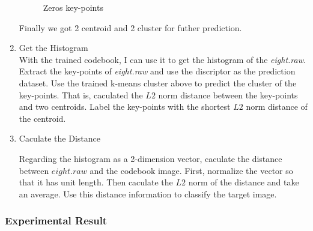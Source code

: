 \documentclass[11pt]{article}
\begin{document}
\begin{enumerate}
\begin{figure}[!htbp]
	\qquad
{}
 \qquad
{}
 \qquad
{}
 \qquad
{}
 
\caption{Zeros key-points} 
\label{Zeros}  
\end{figure}


Finally we got 2 centroid and 2 cluster for futher prediction.
\item Get the Histogram \\
With the trained codebook, I can use it to get the histogram of the {\it eight.raw}. Extract the key-points of {\it eight.raw} and use the discriptor as the prediction dataset. Use the trained k-means cluster above to predict the cluster of the key-points. That is, caculated the $L2$ norm distance between the key-points and two centroids. Label the key-points with the shortest $L2$ norm distance of the centroid.

\item Caculate the Distance

Regarding the histogram as a 2-dimension vector, caculate the distance between $eight.raw$ and the codebook image. First, normalize the vector so that it has unit length. Then caculate the $L2$ norm of the distance and take an average. Use this distance information to classify the target image.
 
\end{enumerate} 

\subsubsection{Experimental Result}
\end{document}
